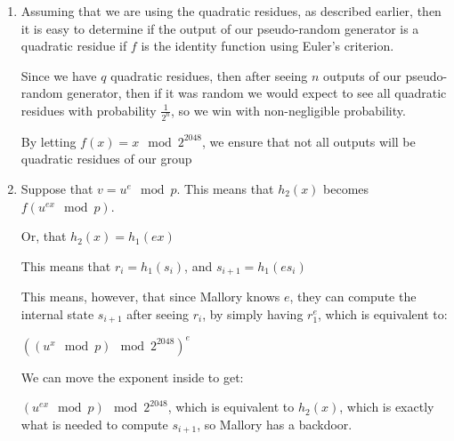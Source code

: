 \begin{enumerate}[label=(\alph*)]
\begin{enumerate}[label=(\roman*)]
      \item
        Assuming that we are using the quadratic residues, as described earlier, then it is easy to determine if the output of our pseudo-random generator is a quadratic residue if $f$ is the identity function using Euler's criterion.

        Since we have $q$ quadratic residues, then after seeing $n$ outputs of our pseudo-random generator, then if it was random we would expect to see all quadratic residues with probability $\frac{1}{2^n}$, so we win with non-negligible probability.

        By letting $f(x) = x \mod{2^{2048}}$, we ensure that not all outputs will be quadratic residues of our group

      \item
        Suppose that $v = u^{e} \mod{p}$. This means that $h_2(x)$ becomes $f(u^{ex} \mod{p})$.

        Or, that $h_2(x) = h_1(ex)$

        This means that $r_i = h_1(s_i)$, and $s_{i+1} = h_1(es_i)$

        This means, however, that since Mallory knows $e$, they can compute the internal state $s_{i+1}$ after seeing $r_i$, by simply having $r_1^e$, which is equivalent to:

        $((u^x \mod {p}) \mod{2^{2048}})^e$

        We can move the exponent inside to get:

        $(u^{ex} \mod {p}) \mod {2^{2048}}$, which is equivalent to $h_2(x)$, which is exactly what is needed to compute $s_{i+1}$, so Mallory has a backdoor.








        
    \end{enumerate}
        
\end{enumerate}

